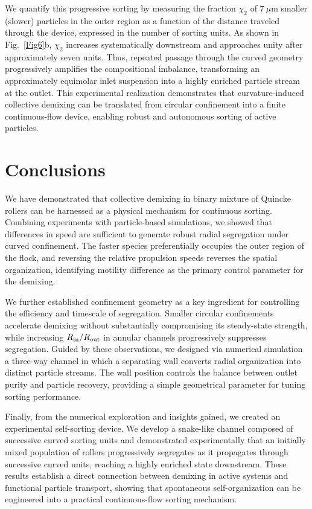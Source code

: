 \documentclass[aps,pre,twocolumn,amsmath,amssymb,notitlepage,superscriptaddress,longbibliography,nofootinbib,10pt]{revtex4-1}
\begin{document}
We quantify this progressive sorting by measuring the fraction $\chi_2$ of $7~\mu\mathrm{m}$ smaller (slower) particles in the outer region as a function of the distance traveled through the device, expressed in the number of sorting units. As shown in Fig.~\ref{Fig6}b, $\chi_2$ increases systematically downstream and approaches unity after approximately seven units. Thus, repeated passage through the curved geometry progressively amplifies the compositional imbalance, transforming an approximately equimolar inlet suspension into a highly enriched particle stream at the outlet. This experimental realization demonstrates that curvature-induced collective demixing can be translated from circular confinement into a finite continuous-flow device, enabling robust and autonomous sorting of active particles.

\section*{Conclusions}
We have demonstrated that collective demixing in binary mixture of Quincke rollers can be harnessed as a physical mechanism for continuous sorting. Combining experiments with particle-based simulations, we showed that differences in speed are sufficient to generate robust radial segregation under curved confinement. The faster species preferentially occupies the outer region of the flock, and reversing the relative propulsion speeds reverses the spatial organization, identifying motility difference as the primary control parameter for the demixing.

We further established confinement geometry as a key ingredient for controlling the efficiency and timescale of segregation. Smaller circular confinements accelerate demixing without substantially compromising its steady-state strength, while increasing $R_{\rm in}/R_{\rm out}$ in annular channels progressively suppresses segregation. Guided by these observations, we designed via numerical simulation a three-way channel in which a separating wall converts radial organization into distinct particle streams. The wall position controls the balance between outlet purity and particle recovery, providing a simple geometrical parameter for tuning sorting performance.

Finally, from the numerical exploration and insights gained, we  created an experimental self-sorting device. We develop a snake-like channel composed of successive curved sorting units and demonstrated experimentally that an initially mixed population of rollers progressively segregates as it propagates through successive curved units, reaching a highly enriched state downstream. These results establish a direct connection between demixing in active systems and functional particle transport, showing that spontaneous self-organization can be engineered into a practical continuous-flow sorting mechanism.
\end{document}
